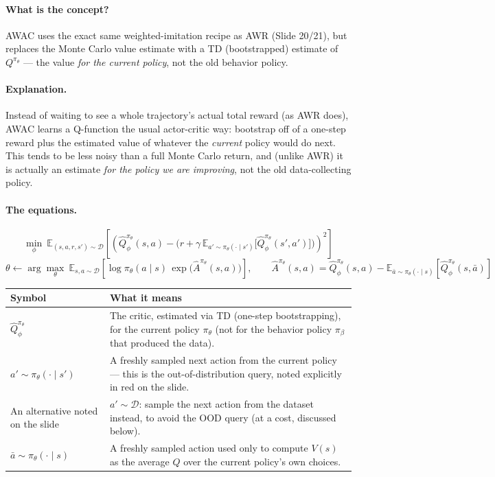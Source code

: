 \documentclass[11pt]{article}
\begin{document}
\paragraph{What is the concept?}
AWAC uses the exact same weighted-imitation recipe as AWR (Slide 20/21), but replaces
the Monte Carlo value estimate with a TD (bootstrapped) estimate of $Q^{\pi_\theta}$ ---
the value \emph{for the current policy}, not the old behavior policy.

\paragraph{Explanation.}
Instead of waiting to see a whole trajectory's actual total reward (as AWR does), AWAC
learns a Q-function the usual actor-critic way: bootstrap off of a one-step reward plus
the estimated value of whatever the \emph{current} policy would do next. This tends to be
less noisy than a full Monte Carlo return, and (unlike AWR) it is actually an estimate
\emph{for the policy we are improving}, not the old data-collecting policy.

\paragraph{The equations.}
$$\min_\phi\ \mathbb{E}_{(s,a,r,s')\sim\mathcal{D}}\left[\left(\hat Q_\phi^{\pi_\theta}(s,a) -
\Big(r + \gamma\,\mathbb{E}_{a'\sim\pi_\theta(\cdot\mid s')}\big[\hat Q_\phi^{\pi_\theta}(s',a')\big]\Big)\right)^2\right]$$
$$\theta \leftarrow \arg\max_\theta\ \mathbb{E}_{s,a\sim\mathcal{D}}\left[\log \pi_\theta(a\mid s)\,
\exp\big(\hat A^{\pi_\theta}(s,a)\big)\right], \qquad
\hat A^{\pi_\theta}(s,a) = \hat Q_\phi^{\pi_\theta}(s,a) -
\mathbb{E}_{\bar a\sim\pi_\theta(\cdot\mid s)}\left[\hat Q_\phi^{\pi_\theta}(s,\bar a)\right]$$

\begin{center}
\begin{tabular}{@{}p{3.2cm}p{10.3cm}@{}}
\toprule
Symbol & What it means \\
\midrule
$\hat Q_\phi^{\pi_\theta}$ & The critic, estimated via TD (one-step bootstrapping), for
the current policy $\pi_\theta$ (not for the behavior policy $\pi_\beta$ that produced
the data). \\
$a'\sim\pi_\theta(\cdot\mid s')$ & A freshly sampled next action from the current policy
--- this is the out-of-distribution query, noted explicitly in red on the slide. \\
An alternative noted on the slide & $a' \sim \mathcal{D}$: sample the next action from
the dataset instead, to avoid the OOD query (at a cost, discussed below). \\
$\bar a \sim \pi_\theta(\cdot\mid s)$ & A freshly sampled action used only to compute
$V(s)$ as the average $Q$ over the current policy's own choices. \\
\bottomrule
\end{tabular}
\end{center}
\end{document}
